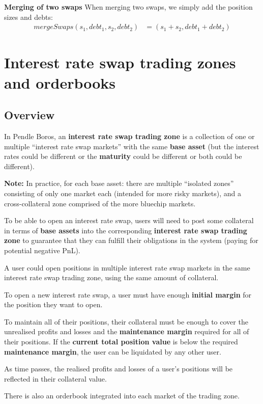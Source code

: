 \documentclass{article}%
\begin{document}
\textbf{Merging of two swaps} \label{merge}
When merging two swaps, we simply add the position sizes and debts:
    \begin{align*}
        mergeSwaps(s_1, debt_1, s_2, debt_2) &= (s_1+s_2, debt_1+debt_2)
    \end{align*}
\section{Interest rate swap trading zones and orderbooks}
\subsection{Overview}

In Pendle Boros, an \textbf{interest rate swap trading zone} is a collection of one or multiple ``interest rate swap markets'' with the same \textbf{base asset} (but the interest rates could be different or the \textbf{maturity} could be different or both could be different).

\textbf{Note:} In practice, for each base asset: there are multiple ``isolated zones'' consisting of only one market each (intended for more risky markets), and a cross-collateral zone comprised of the more bluechip markets.

To be able to open an interest rate swap, users will need to post some collateral in terms of \textbf{base assets} into the corresponding \textbf{interest rate swap trading zone} to guarantee that they can fulfill their obligations in the system (paying for potential negative PnL).

A user could open positions in multiple interest rate swap markets in the same interest rate swap trading zone, using the same amount of collateral.

To open a new interest rate swap, a user must have enough \textbf{initial margin} for the position they want to open.

To maintain all of their positions, their collateral must be enough to cover the unrealised profits and losses and the \textbf{maintenance margin} required for all of their positions. If the \textbf{current total position value} is below the required \textbf{maintenance margin},  the user can be liquidated by any other user.

As time passes, the realised profits and losses of a user's positions will be reflected in their collateral value.

There is also an orderbook integrated into each market of the trading zone.
\end{document}
